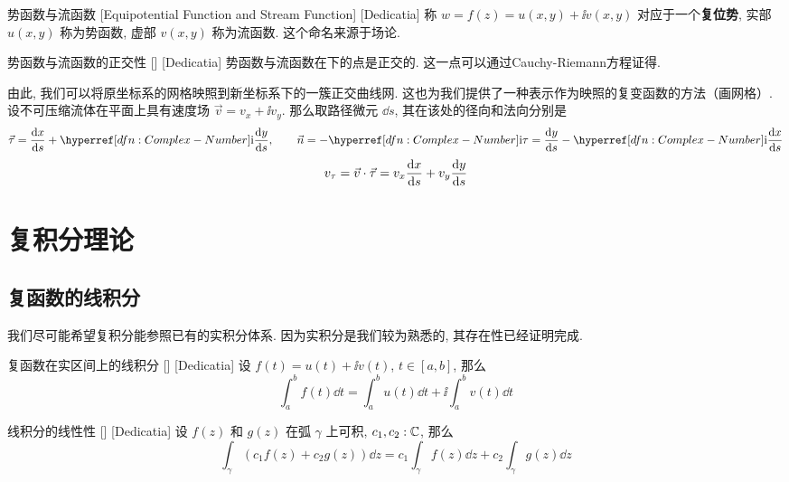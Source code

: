         \begin{dfn}
            {势函数与流函数}
            [Equipotential Function and Stream Function]
            [Dedicatia]
            称\Analytic{}  \(w=f(z)=u(x,y)+\ii v(x,y)\) 对应于一个\textbf{复位势}, 实部 \(u(x,y)\) 称为势函数, 虚部 \(v(x,y)\) 称为流函数. 这个命名来源于场论. 
        \end{dfn}

        \begin{ppt}
            {势函数与流函数的正交性}
            []
            [Dedicatia]
            势函数与流函数在\ConformalMapping 下的点是正交的. 这一点可以通过Cauchy-Riemann方程证得. 
        \end{ppt}

        由此, 我们可以将原坐标系的网格映照到新坐标系下的一簇正交曲线网. 这也为我们提供了一种表示作为映照的复变函数的方法（画网格）. \\
        设不可压缩流体在平面上具有速度场 \(\vec{v}=v_x+\ii v_y\). 那么取路径微元 \(\dd{s}\), 其在该处的径向和法向分别是
        \[\vec{\tau}=\dv{x}{s}+\ii\dv{y}{s},\qquad\vec{n}=-\ii\tau=\dv{y}{s}-\ii\dv{x}{s}\]
        \[v_\tau=\vec{v}\cdot\vec{\tau}=v_x\dv{x}{s}+v_y\dv{y}{s}\]

        \continued

\section{复积分理论}

    \subsection{复函数的线积分}
    
        我们尽可能希望复积分能参照已有的实积分体系. 因为实积分是我们较为熟悉的, 其存在性已经证明完成. 
        
        \begin{dfn}
            {复函数在实区间上的线积分}
            []
            [Dedicatia]
            设 \(f(t)=u(t)+\ii v(t)\),  \(t\in[a,b]\), 那么
            \[\int_{a}^{b}f(t)\dd{t}=\int_{a}^{b}u(t)\dd{t}+\ii\int_{a}^{b}v(t)\dd{t}\]
        \end{dfn}
        
        \begin{ppt}
            {线积分的线性性}
            []
            [Dedicatia]
            设 \(f(z)\) 和 \(g(z)\) 在弧 \(\gamma\) 上可积,  \(c_1,c_2:\operatorname{\mathbb{C}}\), 那么
            \[\int_\gamma (c_1f(z)+c_2g(z))\dd{z}=c_1\int_\gamma f(z)\dd{z}+c_2\int_\gamma g(z)\dd{z}\]
        \end{ppt}

